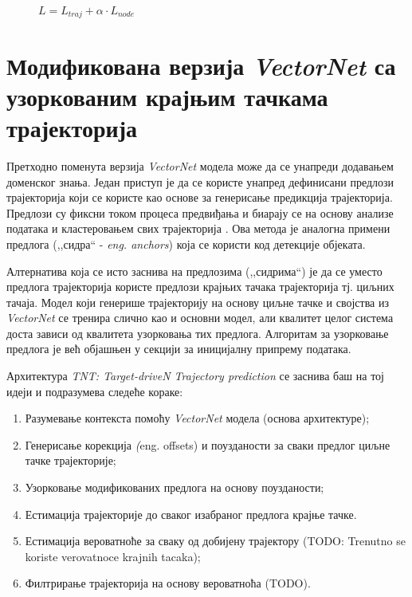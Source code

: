 \documentclass[11pt,oneside]{memoir}
\begin{document}
\begin{figure}[H]
  \centering
  $L = L_{traj} + \alpha \cdot L_{node}$
\end{figure}

\section{Модификована верзија \textit{VectorNet} са узоркованим крајњим тачкама трајекторија}

Претходно поменута верзија \textit{VectorNet} модела може да се унапреди додавањем доменског знања. Један приступ је да се користе унапред
дефинисани предлози трајекторија који се користе као основе за генерисање предикција трајекторија. Предлози су фиксни током процеса
предвиђања и биарају се на основу анализе података и кластеровањем свих трајекторија \cite{multipath}.
Ова метода је аналогна примени предлога (,,сидра`` - \textit{eng. anchors}) која се користи код детекције објеката.

Алтернатива која се исто заснива на предлозима (,,сидрима``) је да се уместо предлога трајекторија користе предлози крајњих тачака трајекторија
тј. циљних тачаја. Модел који генерише трајекторију на основу циљне тачке и својства из \textit{VectorNet} се тренира слично као и основни модел, 
али квалитет целог система доста зависи од квалитета узорковања тих предлога. Алгоритам за узорковање предлога је већ објашњен у секцији за
иницијалну припрему података.

Архитектура \textit{TNT: Target-driveN Trajectory prediction} \cite{tnt} се заснива баш на тој идеји и подразумева следеће кораке:
\begin{enumerate}
  \item Разумевање контекста помоћу \textit{VectorNet} модела (основа архитектуре);
  \item Генерисање корекција \textit(eng. offsets) и поузданости за сваки предлог циљне тачке трајекторије;
  \item Узорковање модификованих предлога на основу поузданости;
  \item Естимација трајекторије до сваког изабраног предлога крајње тачке.
  \item Естимација вероватноће за сваку од добијену трајектору (TODO: Trenutno se koriste verovatnoce krajnih tacaka);
  \item Филтрирање трајекторија на основу вероватноћа (TODO).
\end{enumerate}
\end{document}
